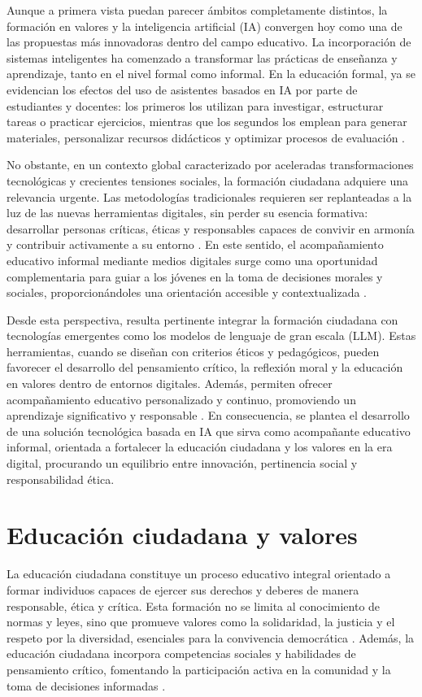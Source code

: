 Aunque a primera vista puedan parecer ámbitos completamente distintos, la
formación en valores y la inteligencia artificial (IA) convergen hoy como una
de las propuestas más innovadoras dentro del campo educativo. La incorporación
de sistemas inteligentes ha comenzado a transformar las prácticas de enseñanza
y aprendizaje, tanto en el nivel formal como informal. En la educación formal,
ya se evidencian los efectos del uso de asistentes basados en IA por parte de
estudiantes y docentes: los primeros los utilizan para investigar, estructurar
tareas o practicar ejercicios, mientras que los segundos los emplean para
generar materiales, personalizar recursos didácticos y optimizar procesos de
evaluación \cite{elstad2024ai, frontiers2025education}.

No obstante, en un contexto global caracterizado por aceleradas
transformaciones tecnológicas y crecientes tensiones sociales, la formación
ciudadana adquiere una relevancia urgente. Las metodologías tradicionales
requieren ser replanteadas a la luz de las nuevas herramientas digitales, sin
perder su esencia formativa: desarrollar personas críticas, éticas y
responsables capaces de convivir en armonía y contribuir activamente a su
entorno \cite{betterinternet2024}. En este sentido, el acompañamiento educativo
informal mediante medios digitales surge como una oportunidad complementaria
para guiar a los jóvenes en la toma de decisiones morales y sociales,
proporcionándoles una orientación accesible y contextualizada
\cite{carter2024ethics, seibt2024llm}.

Desde esta perspectiva, resulta pertinente integrar la formación ciudadana con
tecnologías emergentes como los modelos de lenguaje de gran escala (LLM). Estas
herramientas, cuando se diseñan con criterios éticos y pedagógicos, pueden
favorecer el desarrollo del pensamiento crítico, la reflexión moral y la
educación en valores dentro de entornos digitales. Además, permiten ofrecer
acompañamiento educativo personalizado y continuo, promoviendo un aprendizaje
significativo y responsable \cite{frontiers2025psychology, elstad2024ai}. En
consecuencia, se plantea el desarrollo de una solución tecnológica basada en IA
que sirva como acompañante educativo informal, orientada a fortalecer la
educación ciudadana y los valores en la era digital, procurando un equilibrio
entre innovación, pertinencia social y responsabilidad ética.

\section{Educación ciudadana y valores}
La educación ciudadana constituye un proceso educativo integral orientado a
formar individuos capaces de ejercer sus derechos y deberes de manera
responsable, ética y crítica. Esta formación no se limita al conocimiento de
normas y leyes, sino que promueve valores como la solidaridad, la justicia y el
respeto por la diversidad, esenciales para la convivencia democrática
\cite{unesco2021global, torney2007civic}. Además, la educación ciudadana
incorpora competencias sociales y habilidades de pensamiento crítico,
fomentando la participación activa en la comunidad y la toma de decisiones
informadas \cite{bentley2018education}.

